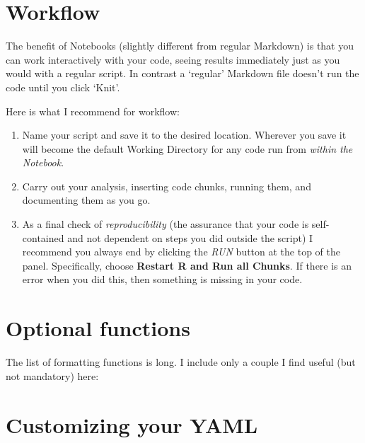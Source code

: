 \documentclass[
]{book}
\providecommand{\tightlist}{%
  \setlength{\itemsep}{0pt}\setlength{\parskip}{0pt}}
\begin{document}
\hypertarget{workflow}{%
\section*{Workflow}\label{workflow}}

The benefit of Notebooks (slightly different from regular Markdown) is that you can work interactively with your code, seeing results immediately just as you would with a regular script. In contrast a `regular' Markdown file doesn't run the code until you click `Knit'.

Here is what I recommend for workflow:

\begin{enumerate}
\def\labelenumi{\arabic{enumi}.}
\tightlist
\item
  Name your script and save it to the desired location. Wherever you save it will become the default Working Directory for any code run from \emph{within the Notebook}.\\
\item
  Carry out your analysis, inserting code chunks, running them, and documenting them as you go.\\
\item
  As a final check of \emph{reproducibility} (the assurance that your code is self-contained and not dependent on steps you did outside the script) I recommend you always end by clicking the \emph{RUN} button at the top of the panel. Specifically, choose \textbf{Restart R and Run all Chunks}. If there is an error when you did this, then something is missing in your code.
\end{enumerate}

\hypertarget{optional-functions}{%
\section*{Optional functions}\label{optional-functions}}

The list of formatting functions is long. I include only a couple I find useful (but not mandatory) here:

\hypertarget{customizing-your-yaml}{%
\section*{Customizing your YAML}\label{customizing-your-yaml}}
\end{document}
